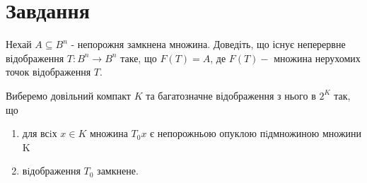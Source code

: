 
\chapter{Завдання \theHchapter}

\begin{tcolorbox}[title=Завдання]
    Нехай $A \subseteq B^{n}$ - непорожня замкнена множина. 
    Доведіть, що існує неперервне відображення 
    $T: B^{n} \rightarrow B^{n}$ таке, що $F(T)=A$, 
    де $F(T)-$ множина нерухомих точок відображення $T$.
\end{tcolorbox}



Виберемо довільний компакт $K$ та багатозначне 
відображення з нього в $2^K$ так, що

\begin{enumerate}
    \item для всiх $x \in K$ множина $T_0x$ є непорожньою
        опуклою пiдмножиною множини K

    
    \item вiдображення $T_0$ замкнене.
\end{enumerate}
